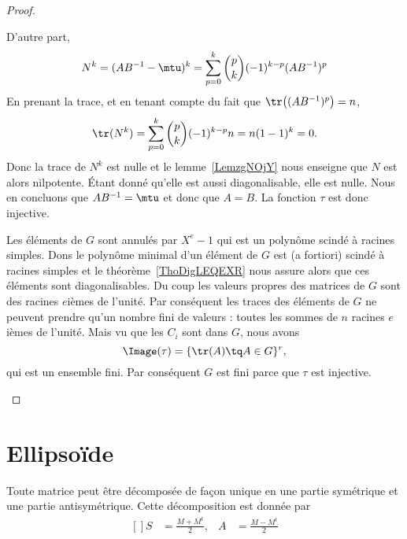 \begin{proof}
\begin{subproof}
		D'autre part,
		\begin{equation}
			N^k=(AB^{-1}-\mtu)^k=\sum_{p=0}^k{p\choose k}(-1)^{k-p}(AB^{-1})^p
		\end{equation}
		En prenant la trace, et en tenant compte du fait que \( \tr\big( (AB^{-1})^p \big)=n\),
		\begin{equation}
			\tr(N^k)=\sum_{p=0}^k{p\choose k}(-1)^{k-p}n=n(1-1)^k=0.
		\end{equation}
		Donc la trace de \( N^k\) est nulle et le lemme~\ref{LemzgNOjY} nous enseigne que \( N\) est alors nilpotente. Étant donné qu'elle est aussi diagonalisable, elle est nulle. Nous en concluons que \( AB^{-1}=\mtu\) et donc que \( A=B\). La fonction \( \tau\) est donc injective.


		Les éléments de \( G\) sont annulés par \( X^e-1\) qui est un polynôme scindé à racines simples. Dons le polynôme minimal d'un élément de \( G\) est (a fortiori) scindé à racines simples et le théorème~\ref{ThoDigLEQEXR} nous assure alors que ces éléments sont diagonalisables. Du coup les valeurs propres des matrices de \( G\) sont des racines \( e\)ièmes de l'unité. Par conséquent les traces des éléments de \( G\) ne peuvent prendre qu'un nombre fini de valeurs : toutes les sommes de \( n\) racines \( e\)ièmes de l'unité. Mais vu que les \( C_i\) sont dans \( G\), nous avons
		\begin{equation}
			\Image(\tau)=\{ \tr(A)\tq A\in G \}^r,
		\end{equation}
		qui est un ensemble fini. Par conséquent \( G\) est fini parce que \( \tau\) est injective.
	\end{subproof}
\end{proof}

\section{Ellipsoïde}

\begin{lemma}   \label{LemYVWoohcjIX}
	Toute matrice peut être décomposée de façon unique en une partie symétrique et une partie antisymétrique. Cette décomposition est donnée par
	\begin{equation}\label{subEqHIQooyhiWM}
		\begin{aligned}[]
			S & =\frac{ M+M^t }{ 2 }, & A & =\frac{ M-M^t }{ 2 }
		\end{aligned}
	\end{equation}
\end{lemma}

